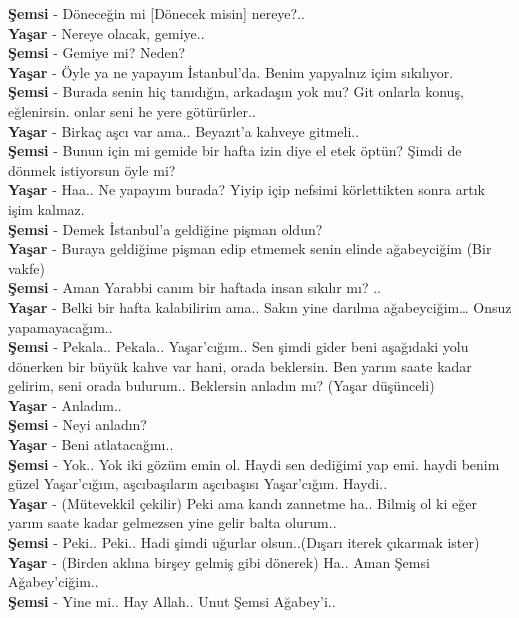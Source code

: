 \documentclass[]{book}
\begin{document}
\textbf{Şemsi} - Döneceğin mi {[}Dönecek misin{]} nereye?..\\
\textbf{Yaşar} - Nereye olacak, gemiye..\\
\textbf{Şemsi} - Gemiye mi? Neden?\\
\textbf{Yaşar} - Öyle ya ne yapayım İstanbul'da. Benim yapyalnız içim sıkılıyor.\\
\textbf{Şemsi} - Burada senin hiç tanıdığın, arkadaşın yok mu? Git onlarla konuş, eğlenirsin. onlar seni he yere götürürler..\\
\textbf{Yaşar} - Birkaç aşcı var ama.. Beyazıt'a kahveye gitmeli..\\
\textbf{Şemsi} - Bunun için mi gemide bir hafta izin diye el etek öptün? Şimdi de dönmek istiyorsun öyle mi?\\
\textbf{Yaşar} - Haa.. Ne yapayım burada? Yiyip içip nefsimi körlettikten sonra artık işim kalmaz.\\
\textbf{Şemsi} - Demek İstanbul'a geldiğine pişman oldun?\\
\textbf{Yaşar} - Buraya geldiğime pişman edip etmemek senin elinde ağabeyciğim (Bir vakfe)\\
\textbf{Şemsi} - Aman Yarabbi canım bir haftada insan sıkılır mı? ..\\
\textbf{Yaşar} - Belki bir hafta kalabilirim ama.. Sakın yine darılma ağabeyciğim\ldots{} Onsuz yapamayacağım..\\
\textbf{Şemsi} - Pekala.. Pekala.. Yaşar'cığım.. Sen şimdi gider beni aşağıdaki yolu dönerken bir büyük kahve var hani, orada beklersin. Ben yarım saate kadar gelirim, seni orada bulurum.. Beklersin anladın mı? (Yaşar düşünceli)\\
\textbf{Yaşar} - Anladım..\\
\textbf{Şemsi} - Neyi anladın?\\
\textbf{Yaşar} - Beni atlatacağını..\\
\textbf{Şemsi} - Yok.. Yok iki gözüm emin ol. Haydi sen dediğimi yap emi. haydi benim güzel Yaşar'cığım, aşcıbaşıların aşcıbaşısı Yaşar'cığım. Haydi..\\
\textbf{Yaşar} - (Mütevekkil çekilir) Peki ama kandı zannetme ha.. Bilmiş ol ki eğer yarım saate kadar gelmezsen yine gelir balta olurum..\\
\textbf{Şemsi} - Peki.. Peki.. Hadi şimdi uğurlar olsun..(Dışarı iterek çıkarmak ister)\\
\textbf{Yaşar} - (Birden aklına birşey gelmiş gibi dönerek) Ha.. Aman Şemsi Ağabey'ciğim..\\
\textbf{Şemsi} - Yine mi.. Hay Allah.. Unut Şemsi Ağabey'i..\\
\end{document}
